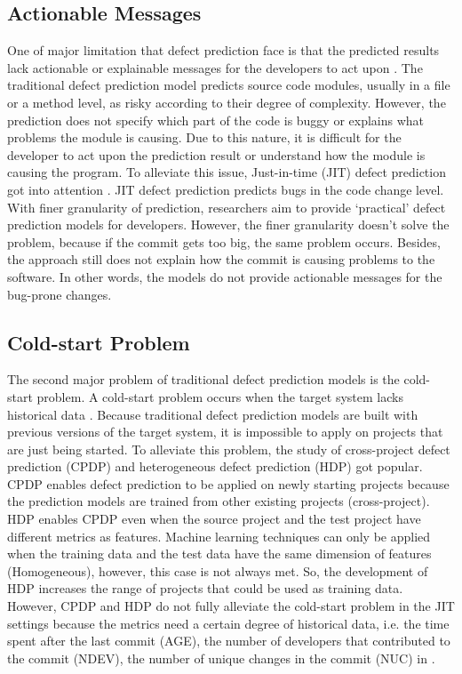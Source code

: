 \subsection{Actionable Messages}
One of major limitation that defect prediction face is that the predicted results lack actionable or explainable messages for the developers to act upon \cite{lewis2013does}.
The traditional defect prediction model predicts source code modules, usually in a file or a method level, as risky according to their degree of complexity.
However, the prediction does not specify which part of the code is buggy or explains what problems the module is causing.
Due to this nature, it is difficult for the developer to act upon the prediction result or understand how the module is causing the program.
To alleviate this issue, Just-in-time (JIT) defect prediction got into attention \cite{kamei2012large}.
JIT defect prediction predicts bugs in the code change level.
With finer granularity of prediction, researchers aim to provide `practical' defect prediction models for developers.
However, the finer granularity doesn't solve the problem, because if the commit gets too big, the same problem occurs.
Besides, the approach still does not explain how the commit is causing problems to the software.
In other words, the models do not provide actionable messages for the bug-prone changes.

\subsection{Cold-start Problem}
The second major problem of traditional defect prediction models is the cold-start problem.
A cold-start problem occurs when the target system lacks historical data \cite{schein2002methods}. 
Because traditional defect prediction models are built with previous versions of the target system, it is impossible to apply on projects that are just being started.
To alleviate this problem, the study of cross-project defect prediction (CPDP) and heterogeneous defect prediction (HDP) got popular.
CPDP enables defect prediction to be applied on newly starting projects because the prediction models are trained from other existing projects (cross-project).
HDP enables CPDP even when the source project and the test project have different metrics as features.
Machine learning techniques can only be applied when the training data and the test data have the same dimension of features (Homogeneous), however, this case is not always met.
So, the development of HDP increases the range of projects that could be used as training data.
However, CPDP and HDP do not fully alleviate the cold-start problem in the JIT settings because the metrics need a certain degree of historical data, i.e. the time spent after the last commit (AGE), the number of developers that contributed to the commit (NDEV), the number of unique changes in the commit (NUC) in \cite{kamei2012large}.

